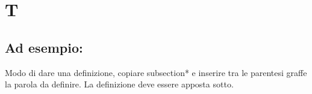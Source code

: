 \section*{T}
\markright{}
\subsection*{Ad esempio:}
Modo di dare una definizione, copiare subsection*{} e inserire tra le parentesi graffe la parola da definire. La definizione deve essere apposta sotto.